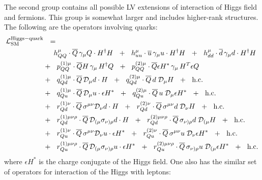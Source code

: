 \documentclass[12pt,preprintnumbers,nofootinbib]{revtex4}
\newcommand{\ov}{\overline}
\newcommand{\md}{\mathcal{D}}
\begin{document}
	The second group contains all possible LV extensions of interaction of
	Higgs field and fermions. 
	This group is somewhat larger and includes higher-rank structures.
	The following are the operators involving quarks:
\begin{align}
\notag
	\mathcal{L}_{\rm SM}^{\rm Higgs-quark} & ~~=~~
	\\
\notag
	&
	\phantom{+~~}
	h_{QQ}^\mu \cdot
	\ov{Q}\, \gamma_\mu Q \cdot H^\dag H ~~+~~
	h_{uu}^\mu \cdot
	\ov{u}\, \gamma_\mu u \cdot H^\dag H ~~+~~
	h_{dd}^\mu \cdot
	\ov{d}\, \gamma_\mu d \cdot H^\dag H 
	\\
\notag
	&
	+~~
	p^{(1)\mu}_{QQ} \cdot
	\ov{Q}H \, \gamma_\mu\, H^\dag Q ~~+~~
	p^{(2)\mu}_{QQ} \cdot
	\ov{Q}\epsilon H^* \, \gamma_\mu \, H^T \epsilon Q 
	\\
\notag
	&
	+~~
	q^{(1)\mu}_{Qd} \cdot
	\ov{Q}\, \md_\mu d\cdot H ~~+~~
	q^{(2)\mu}_{Qd} \cdot
	\ov{Q}\, d \; \md_\mu H ~~+~~
	\text{h.c.}
	\\
\notag
	&
	+~~
	q^{(1)\mu}_{Qu} \cdot
	\ov{Q}\, \md_\mu u \cdot \epsilon H^* ~~+~~
	q^{(2)\mu}_{Qu} \cdot
	\ov{Q}\, u \; \md_\mu \epsilon H^* ~~+~~
	\text{h.c.}
	\\
\notag
	&
	+~~
	r^{(1)\nu}_{Qd} \cdot
	\ov{Q}\, \sigma^{\mu\nu} \md_\nu d \cdot H ~~+~~
	r^{(2)\nu}_{Qd} \cdot
	\ov{Q}\, \sigma^{\mu\nu} d\; \md_\nu H ~~+~~
	\text{h.c.}
	\\
\notag
	&
	+~~
	r^{(1)\mu\nu\rho}_{Qd} \cdot
	\ov{Q}\, \md_{(\mu} \sigma_{\nu)\rho} d \cdot H ~~+~~
	r^{(2)\mu\nu\rho}_{Qd} \cdot
	\ov{Q}\, \sigma_{\nu)\rho} d \; \md_{(\mu} H ~~+~~
	\text{h.c.}
	\\
\notag
	&
	+~~
	r^{(1)\nu}_{Qu} \cdot
	\ov{Q}\, \sigma^{\mu\nu} \md_\nu u \cdot \epsilon H^* ~~+~~
	r^{(2)\nu}_{Qu} \cdot
	\ov{Q}\, \sigma^{\mu\nu} u\; \md_\nu \epsilon H^* ~~+~~
	\text{h.c.}
	\\
\notag
	&
	+~~
	r^{(1)\mu\nu\rho}_{Qu} \cdot
	\ov{Q}\, \md_{(\mu} \sigma_{\nu)\rho} u \cdot \epsilon H^* ~~+~~
	r^{(2)\mu\nu\rho}_{Qu} \cdot
	\ov{Q}\, \sigma_{\nu)\rho} u \; \md_{(\mu} \epsilon H^* ~~+~~
	\text{h.c.}
\end{align}
	where $ \epsilon H^* $ is the charge conjugate of the Higgs field.	
	One also has the similar set of operators for interaction of the Higgs 
	with leptons:
\end{document}
